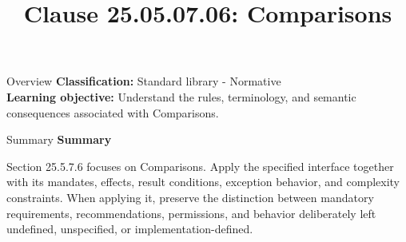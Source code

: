 \documentclass[10pt,letterpaper]{article}
\title{Clause 25.05.07.06: Comparisons}
\author{}
\date{}
\begin{document}
\maketitle
\begin{CornellOverviewBox}{Overview}
\textbf{Classification:} Standard library - Normative\\[2pt]
\textbf{Learning objective:} Understand the rules, terminology, and semantic consequences associated with Comparisons.
\end{CornellOverviewBox}\begin{CornellSummaryBox}{Summary}
{\sffamily\bfseries\color{Accent} Summary}\par\vspace{3pt}Section 25.5.7.6 focuses on Comparisons. Apply the specified interface together with its mandates, effects, result conditions, exception behavior, and complexity constraints. When applying it, preserve the distinction between mandatory requirements, recommendations, permissions, and behavior deliberately left undefined, unspecified, or implementation-defined.
\end{CornellSummaryBox}
\end{document}
